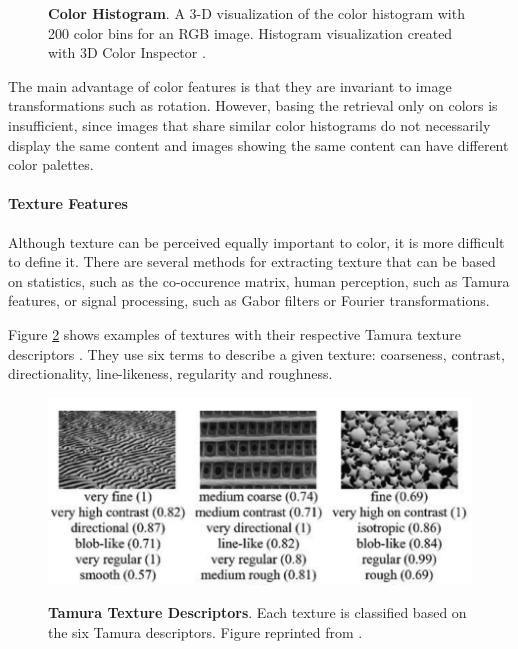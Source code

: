 \documentclass[12pt]{report}
\begin{document}
\begin{figure}[h]
\centering
{}
\caption{\label{fig:color_hist} \textbf{Color Histogram}. A 3-D visualization of the color histogram with 200 color bins for an RGB image. Histogram visualization created with 3D Color Inspector \cite{barthel_3d_nodate}.}
\end{figure}

The main advantage of color features is that they are invariant to image transformations such as rotation. However, basing the retrieval only on colors is insufficient, since images that share similar color histograms do not necessarily display the same content and images showing the same content can have different color palettes.

\paragraph{Texture Features}
Although texture can be perceived equally important to color, it is more difficult to define it. There are several methods for extracting texture that can be based on statistics, such as the co-occurence matrix, human perception, such as Tamura features, or signal processing, such as Gabor filters or Fourier transformations.

Figure \ref{fig:texture_feat} shows examples of textures with their respective Tamura texture descriptors \cite{tamura1978textural}. They use six terms to describe a given texture: coarseness, contrast, directionality, line-likeness, regularity and roughness. 

\begin{figure}[h]
\centering
{\includegraphics[width=0.7\linewidth]{02_background/CBIR/texture_features}}
\caption{\label{fig:texture_feat} \textbf{Tamura Texture Descriptors}. Each texture is classified based on the six Tamura descriptors. Figure reprinted from \cite{LIN20032255}.}
\end{figure}
\end{document}
